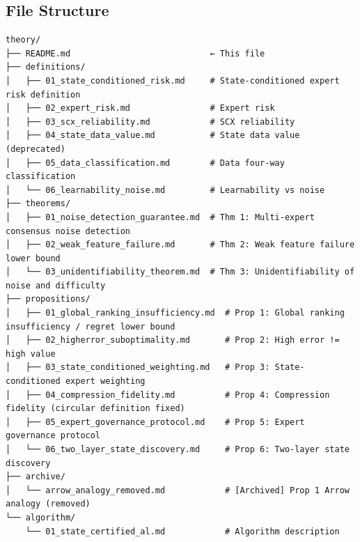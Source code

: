 \documentclass[
  12pt,
]{article}
\begin{document}
\subsection{File Structure}\label{file-structure}

\begin{verbatim}
theory/
├── README.md                            ← This file
├── definitions/
│   ├── 01_state_conditioned_risk.md     # State-conditioned expert risk definition
│   ├── 02_expert_risk.md                # Expert risk
│   ├── 03_scx_reliability.md            # SCX reliability
│   ├── 04_state_data_value.md           # State data value (deprecated)
│   ├── 05_data_classification.md        # Data four-way classification
│   └── 06_learnability_noise.md         # Learnability vs noise
├── theorems/
│   ├── 01_noise_detection_guarantee.md  # Thm 1: Multi-expert consensus noise detection
│   ├── 02_weak_feature_failure.md       # Thm 2: Weak feature failure lower bound
│   └── 03_unidentifiability_theorem.md  # Thm 3: Unidentifiability of noise and difficulty
├── propositions/
│   ├── 01_global_ranking_insufficiency.md  # Prop 1: Global ranking insufficiency / regret lower bound
│   ├── 02_higherror_suboptimality.md       # Prop 2: High error != high value
│   ├── 03_state_conditioned_weighting.md   # Prop 3: State-conditioned expert weighting
│   ├── 04_compression_fidelity.md          # Prop 4: Compression fidelity (circular definition fixed)
│   ├── 05_expert_governance_protocol.md    # Prop 5: Expert governance protocol
│   └── 06_two_layer_state_discovery.md     # Prop 6: Two-layer state discovery
├── archive/
│   └── arrow_analogy_removed.md            # [Archived] Prop 1 Arrow analogy (removed)
└── algorithm/
    └── 01_state_certified_al.md            # Algorithm description
\end{verbatim}
\end{document}

